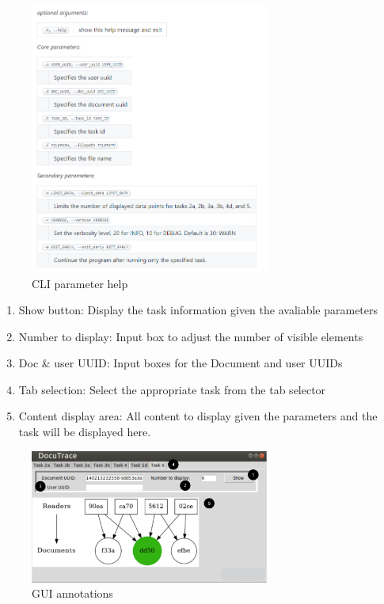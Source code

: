 \documentclass[11pt]{article}
\begin{document}
\begin{figure}[H]
    \centering
    \includegraphics[width=0.7\textwidth]{CLlhelp.png}
    \caption{CLI parameter help}
    \label{fig:CLIhelp}
\end{figure}
\newpage
\begin{enumerate}
    \item Show button: Display the task information given the avaliable parameters
    \item Number to display: Input box to adjust the number of visible elements
    \item Doc \& user UUID: Input boxes for the Document and user UUIDs
    \item Tab selection: Select the appropriate task from the tab selector
    \item Content display area: All content to display given the parameters and the task will be displayed here.
\end{enumerate}

\begin{figure}[H]
    \centering
    \includegraphics[width=0.7\textwidth]{Task6Tab.png}
    \caption{GUI annotations}
    \label{fig:GraphAnnotated}
\end{figure}
\end{document}
